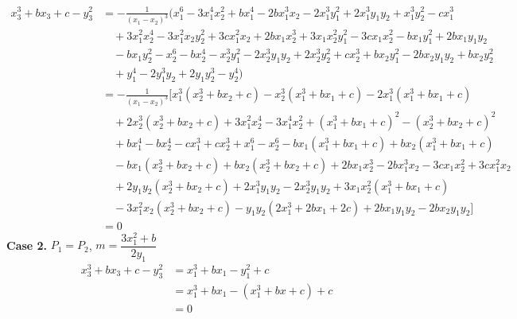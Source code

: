\documentclass[12pt]{article}
\theoremstyle{definition}
\begin{document}
\begin{align*}
x_3^3+bx_3+c-y_3^2&=
-\frac{1}{(x_1-x_2)^3}(x_1^6 - 3x_1^4x_2^2 + bx_1^4 - 2bx_1^3x_2 - 2x_1^3y_1^2 + 2x_1^3y_1y_2 + x_1^3y_2^2 - cx_1^3 \\
&\quad + 3x_1^2x_2^4 - 3x_1^2x_2y_2^2 + 3cx_1^2x_2 + 2bx_1x_2^3 + 3x_1x_2^2y_1^2 - 3cx_1x_2^2 - bx_1y_1^2 + 2bx_1y_1y_2 \\
&\quad  - bx_1y_2^2- x_2^6 - bx_2^4 - x_2^3y_1^2 - 2x_2^3y_1y_2 + 2x_2^3y_2^2 + cx_2^3 + bx_2y_1^2 - 2bx_2y_1y_2 + bx_2y_2^2 \\
&\quad + y_1^4 - 2y_1^3y_2 + 2y_1y_2^3 - y_2^4)\\
&=-\frac{1}{(x_1-x_2)^3}[
x_1^3(x_2^3 + bx_2 + c) - x_2^3(x_1^3 + bx_1 + c) - 2x_1^3(x_1^3 + bx_1 + c)\\
&\quad + 2x_2^3(x_2^3 + bx_2 + c) + 3x_1^2x_2^4 - 3x_1^4x_2^2 + (x_1^3 + bx_1 + c)^2 - (x_2^3 + bx_2 + c)^2\\
&\quad + bx_1^4 - bx_2^4 - cx_1^3 + cx_2^3 + x_1^6 - x_2^6 - bx_1(x_1^3 + bx_1 + c) + bx_2(x_1^3 + bx_1 + c)\\
&\quad - bx_1(x_2^3 + bx_2 + c) + bx_2(x_2^3 + bx_2 + c) + 2bx_1x_2^3 - 2bx_1^3x_2 - 3cx_1x_2^2 + 3cx_1^2x_2\\
&\quad + 2y_1y_2(x_2^3 + bx_2 + c) + 2x_1^3y_1y_2 - 2x_2^3y_1y_2 + 3x_1x_2^2(x_1^3 + bx_1 + c)\\
&\quad - 3x_1^2x_2(x_2^3 + bx_2 + c) - y_1y_2(2x_1^3 + 2bx_1 + 2c) + 2bx_1y_1y_2 - 2bx_2y_1y_2]\\
&=0
\end{align*}
\textbf{Case 2.} $P_1=P_2$, $m=\dfrac{3x_1^2+b}{2y_1}$
\begin{align*}
x_3^3+bx_3+c-y_3^2&=x_1^3 + bx_1 - y_1^2 + c    \\
&= x_1^3 + bx_1 - (x_1^3+bx+c) + c \\
&=0
\end{align*}
\end{document}
